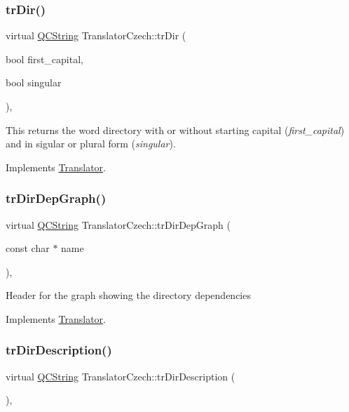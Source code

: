 \subsubsection{\texorpdfstring{trDir()}{trDir()}}
{\footnotesize\ttfamily virtual \mbox{\hyperlink{class_q_c_string}{Q\+C\+String}} Translator\+Czech\+::tr\+Dir (\begin{DoxyParamCaption}\item[{bool}]{first\+\_\+capital,  }\item[{bool}]{singular }\end{DoxyParamCaption})\hspace{0.3cm}{\ttfamily [inline]}, {\ttfamily [virtual]}}

This returns the word directory with or without starting capital ({\itshape first\+\_\+capital}) and in sigular or plural form ({\itshape singular}). 

Implements \mbox{\hyperlink{class_translator}{Translator}}.

\mbox{\label{class_translator_czech_a6f0821145ad572fdce9b88d04bb89f41}} 
\subsubsection{\texorpdfstring{trDirDepGraph()}{trDirDepGraph()}}
{\footnotesize\ttfamily virtual \mbox{\hyperlink{class_q_c_string}{Q\+C\+String}} Translator\+Czech\+::tr\+Dir\+Dep\+Graph (\begin{DoxyParamCaption}\item[{const char $\ast$}]{name }\end{DoxyParamCaption})\hspace{0.3cm}{\ttfamily [inline]}, {\ttfamily [virtual]}}

Header for the graph showing the directory dependencies 

Implements \mbox{\hyperlink{class_translator}{Translator}}.

\mbox{\label{class_translator_czech_afee6a3bd8f2562a1e1c30fd668bf6255}} 
\subsubsection{\texorpdfstring{trDirDescription()}{trDirDescription()}}
{\footnotesize\ttfamily virtual \mbox{\hyperlink{class_q_c_string}{Q\+C\+String}} Translator\+Czech\+::tr\+Dir\+Description (\begin{DoxyParamCaption}{ }\end{DoxyParamCaption})\hspace{0.3cm}{\ttfamily [inline]}, {\ttfamily [virtual]}}

